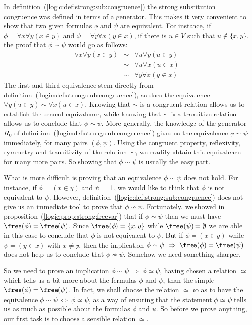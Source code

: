 In definition~(\ref{logic:def:strong:sub:congruence}) the strong
substitution congruence was defined in terms of a generator. This
makes it very convenient to show that two given formulas $\phi$ and
$\psi$ are equivalent. For instance, if $\phi=\forall x\forall
y(x\in y)$ and $\psi=\forall y\forall x(y\in x)$, if there is $u\in
V$ such that $u\not\in\{x,y\}$, the proof that $\phi\sim\psi$ would
go as follows:
    \begin{eqnarray*}
    \forall x\forall y(x\in y)&\sim&\forall u\forall y(u\in y)\\
    &\sim&\forall u\forall x(u\in x)\\
    &\sim&\forall y\forall x(y\in x)
    \end{eqnarray*}
The first and third equivalence stem directly from
definition~(\ref{logic:def:strong:sub:congruence}), as does the
equivalence $\forall y(u\in y)\sim\forall x(u\in x)$. Knowing that
$\sim$ is a congruent relation allows us to establish the second
equivalence, while knowing that $\sim$ is a transitive relation
allows us to conclude that $\phi\sim\psi$. More generally, the
knowledge of the generator $R_{0}$ of
definition~(\ref{logic:def:strong:sub:congruence}) gives us the
equivalence $\phi\sim\psi$ immediately, for many pairs
$(\phi,\psi)$. Using the congruent property, reflexivity, symmetry
and transitivity of the relation~$\sim$, we readily obtain this
equivalence for many more pairs. So showing that $\phi\sim\psi$ is
usually the easy part.

What is more difficult is proving that an equivalence $\phi\sim\psi$
does not hold. For instance, if $\phi=(x\in y)$ and $\psi=\bot$, we
would like to think that $\phi$ is not equivalent to $\psi$.
However, definition~(\ref{logic:def:strong:sub:congruence}) does not
give us an immediate tool to prove that $\phi\not\sim\psi$.
Fortunately, we showed in
proposition~(\ref{logic:prop:strong:freevar}) that if $\phi\sim\psi$
then we must have $\free(\phi)=\free(\psi)$. Since
$\free(\phi)=\{x,y\}$ while $\free(\psi)=\emptyset$ we are able in
this case to conclude that $\phi$ is not equivalent to $\psi$. But
if $\phi=(x\in y)$ while $\psi=(y\in x)$ with $x\neq y$, then the
implication $\phi\sim\psi\ \Rightarrow\ \free(\phi)=\free(\psi)$
does not help us to conclude that $\phi\not\sim\psi$. Somehow we
need something sharper.

So we need to prove an implication $\phi\sim\psi\ \Rightarrow\
\phi\simeq\psi$, having chosen a relation $\simeq$ which tells us a
bit more about the formulas $\phi$ and $\psi$, than the simple
$\free(\phi)=\free(\psi)$. In fact, we shall choose the relation
$\simeq$ so as to have the equivalence $\phi\sim\psi\
\Leftrightarrow\ \phi\simeq\psi$, as a way of ensuring that the
statement $\phi\simeq\psi$ tells us as much as possible about the
formulas $\phi$ and $\psi$. So before we prove anything, our first
task is to choose a sensible relation $\simeq$.

